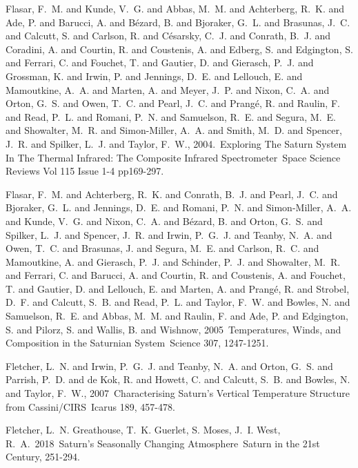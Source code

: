 \documentclass[preprint]{aastex}
\begin{document}
\begin{thebibliography}{28}
 {Flasar}, F.~M. and {Kunde}, V.~G.
and {Abbas}, M.~M. and {Achterberg}, R.~K. and {Ade}, P. and {Barucci}, A. and
{B{\'e}zard}, B. and {Bjoraker}, G.~L. and {Brasunas}, J.~C. and {Calcutt}, S.
and {Carlson}, R. and {C{\'e}sarsky}, C.~J. and {Conrath}, B.~J. and
{Coradini}, A. and {Courtin}, R. and {Coustenis}, A. and {Edberg}, S. and
{Edgington}, S. and {Ferrari}, C. and {Fouchet}, T. and {Gautier}, D. and
{Gierasch}, P.~J. and {Grossman}, K. and {Irwin}, P. and {Jennings}, D.~E. and
{Lellouch}, E. and {Mamoutkine}, A.~A. and {Marten}, A. and {Meyer}, J.~P. and
{Nixon}, C.~A. and {Orton}, G.~S. and {Owen}, T.~C. and {Pearl}, J.~C. and
{Prang{\'e}}, R. and {Raulin}, F. and {Read}, P.~L. and {Romani}, P.~N. and
{Samuelson}, R.~E. and {Segura}, M.~E. and {Showalter}, M.~R. and
{Simon-Miller}, A.~A. and {Smith}, M.~D. and {Spencer}, J.~R. and {Spilker},
L.~J. and {Taylor}, F.~W., 2004.\ Exploring The Saturn System In The Thermal
Infrared: The Composite Infrared Spectrometer\ Space Science Reviews Vol 115
Issue 1-4 pp169-297.

 {Flasar}, F.~M. and {Achterberg},
R.~K. and {Conrath}, B.~J. and {Pearl}, J.~C. and {Bjoraker}, G.~L. and
{Jennings}, D.~E. and {Romani}, P.~N. and {Simon-Miller}, A.~A. and {Kunde},
V.~G. and {Nixon}, C.~A. and {B{\'e}zard}, B. and {Orton}, G.~S. and {Spilker},
L.~J. and {Spencer}, J.~R. and {Irwin}, P.~G.~J. and {Teanby}, N.~A. and
{Owen}, T.~C. and {Brasunas}, J. and {Segura}, M.~E. and {Carlson}, R.~C. and
{Mamoutkine}, A. and {Gierasch}, P.~J. and {Schinder}, P.~J. and {Showalter},
M.~R. and {Ferrari}, C. and {Barucci}, A. and {Courtin}, R. and {Coustenis}, A.
and {Fouchet}, T. and {Gautier}, D. and {Lellouch}, E. and {Marten}, A. and
{Prang{\'e}}, R. and {Strobel}, D.~F. and {Calcutt}, S.~B. and {Read}, P.~L.
and {Taylor}, F.~W. and {Bowles}, N. and {Samuelson}, R.~E. and {Abbas}, M.~M.
and {Raulin}, F. and {Ade}, P. and {Edgington}, S. and {Pilorz}, S. and
{Wallis}, B. and {Wishnow}, 2005\ Temperatures, Winds, and Composition in the
Saturnian System\ Science 307, 1247-1251.

 {Fletcher}, L.~N. and {Irwin},
P.~G.~J. and {Teanby}, N.~A. and {Orton}, G.~S. and {Parrish}, P.~D. and {de
Kok}, R. and {Howett}, C. and {Calcutt}, S.~B. and {Bowles}, N. and {Taylor},
F.~W., 2007\ Characterising Saturn's Vertical Temperature Structure from
Cassini/CIRS\ Icarus 189, 457-478.

 {Fletcher}, L.~N. {Greathouse},
T.~K. {Guerlet}, S. {Moses}, J.~I. {West}, R.~A.\ 2018\ Saturn's Seasonally
Changing Atmosphere\ Saturn in the 21st Century, 251-294.


\end{thebibliography}
\end{document}
